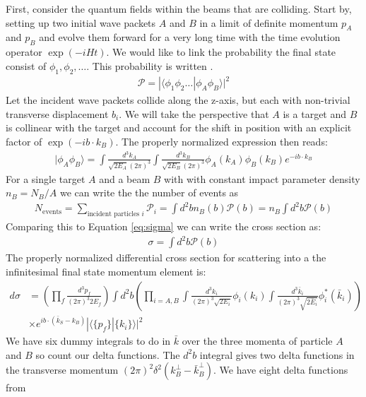 First, consider the quantum fields within the beams that are colliding. Start by,
setting up two initial wave packets $A$ and $B$ in a limit of definite momentum $p_A$ and $p_B$ and evolve them forward for a very long time 
with the time evolution operator $\exp{(-iHt)}$. We would like to link the probability the final state consist of $\phi_1,\phi_2,\ldots$. This probability is written \cite{peskin}.  
\begin{align*}
\mathcal{P} = |\langle \phi_1 \phi_2 \ldots| \phi_A \phi_B \rangle | ^2 
\end{align*}
Let the incident wave packets collide along the z-axis, but each with non-trivial transverse displacement $b_i$.
We will take the perspective that $A$ is a target and $B$ is collinear
with the target and account for the shift in position with an explicit factor of $\exp(-ib \cdot k_B)$. The properly normalized expression then reads:  
\begin{align*}
|\phi_A \phi_B \rangle = \int \frac{d^3k_A}{\sqrt{2E_A}(2\pi)^3} \int \frac{d^3k_B}{\sqrt{2E_B}(2\pi)^3}\phi_A(k_A)\phi_B(k_B) e^{-ib \cdot k_B} 
\end{align*}
For a single target $A$ and a beam $B$ with with constant impact parameter density $n_B = N_B / A$ we can write the the number of events as
\begin{align*}
N_{\textrm{events}} = \sum_{\text{incident particles } i} \mathcal{P}_i = \int d^2b n_B(b) \mathcal{P}(b) = n_B \int d^2b \mathcal{P}(b) 
\end{align*}
Comparing this to Equation \ref{eq:sigma} we can write the cross section as:
\begin{align*}
\sigma = \int d^2 b \mathcal{P}(b) 
\end{align*}
The properly normalized differential cross section for scattering into a the infinitesimal final state momentum element is:
\begin{align*}
 d\sigma &= \left( \prod_f \frac{d^3p_f}{(2\pi)^3 2E_f} \right ) \int d^2b \left ( \prod_{i=A,B}
 \int \frac{d^3 k_i }{(2\pi)^3 \sqrt{2E_i}} \phi_i(k_i) \int \frac{d^3 \bar{k}_i}{(2\pi)^3
\sqrt{2\bar{E}_i}} \phi^*_i(\bar{k}_i) \right)\\ 
 &\times e^{ib\cdot (\bar{k}_S - k_B)} | \langle \{ p_f\} | \{k_i \} \rangle |^2 
\end{align*}
We have six dummy integrals to do in $\bar{k}$ over the three momenta of particle $A$ and $B$
 so count our delta functions. The $d^2b$ integral gives two delta functions in the transverse 
momentum $(2\pi)^2 \delta^2(k_B^\perp - \bar{k}_B^\perp)$.  We have eight delta functions from 
